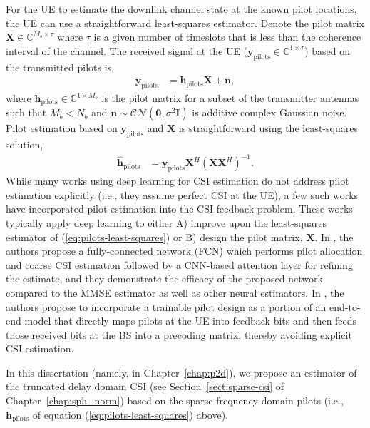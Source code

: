 For the UE to estimate the downlink channel state at the known pilot locations, the UE can use a straightforward least-squares estimator. Denote the pilot matrix $\mathbf{X}\in\mathbb{C}^{M_b \times \tau}$ where $\tau$ is a given number of timeslots that is less than the coherence interval of the channel. The received signal at the UE ($\mathbf{y}_{\text{pilots}}\in\mathbb{C}^{1\times\tau}$) based on the transmitted pilots is,
\begin{align}
	\mathbf{y}_{\text{pilots}} &= \mathbf{h}_{\text{pilots}}\mathbf{X} + \mathbf{n},
\end{align}
where $\mathbf{h}_{\text{pilots}}\in\mathbb{C}^{1\times M_b}$ is the pilot matrix for a subset of the transmitter antennas such that $M_b < N_b$ and $\mathbf{n}\sim\mathcal{CN}(\mathbf{0},\sigma^2\mathbf{I})$ is additive complex Gaussian noise. Pilot estimation based on $\mathbf{y}_{\text{pilots}}$ and $\mathbf{X}$ is straightforward using the least-squares solution,
\begin{align}
	\hat{\mathbf{h}}_{\text{pilots}} &= \mathbf{y}_{\text{pilots}}\mathbf{X}^H(\mathbf{X}\mathbf{X}^H)^{-1}. \label{eq:pilots-least-squares}
\end{align}
While many works using deep learning for CSI estimation do not address pilot estimation explicitly (i.e., they assume perfect CSI at the UE), a few such works have incorporated pilot estimation into the CSI feedback problem. These works typically apply deep learning to either A) improve upon the least-squares estimator of (\ref{eq:pilots-least-squares}) or B) design the pilot matrix, $\mathbf{X}$. In \cite{ref:mashhadi2021pruning}, the authors propose a fully-connected network (FCN) which performs pilot allocation and coarse CSI estimation followed by a CNN-based attention layer for refining the estimate, and they demonstrate the efficacy of the proposed network compared to the MMSE estimator as well as other neural estimators. In \cite{ref:sohrabi2021distributed}, the authors propose to incorporate a trainable pilot design as a portion of an end-to-end model that directly maps pilots at the UE into feedback bits and then feeds those received bits at the BS into a precoding matrix, thereby avoiding explicit CSI estimation.

In this dissertation (namely, in Chapter~\ref{chap:p2d}), we propose an estimator of the truncated delay domain CSI (see Section~\ref{sect:sparse-csi} of Chapter~\ref{chap:sph_norm}) based on the sparse frequency domain pilots (i.e., $\hat{\mathbf{h}}_{\text{pilots}}$ of equation (\ref{eq:pilots-least-squares}) above).

